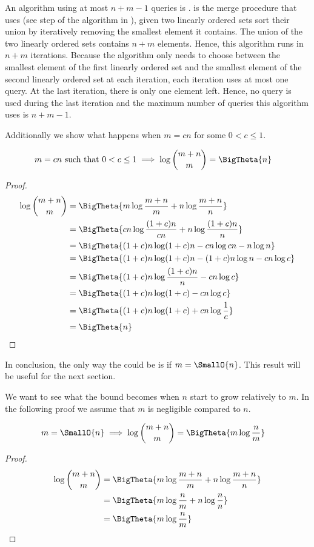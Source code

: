 An algorithm using at most \(n+m-1\) queries is \tapemerge. \tapemerge is the
merge procedure that \mergesort uses (see step  of the \mergesort
algorithm in ), \ie given two linearly ordered sets sort
their union by iteratively removing the smallest element it contains. The union
of the two linearly ordered sets contains \(n+m\) elements. Hence, this
algorithm runs in \(n+m\) iterations. Because the algorithm only needs to
choose between the smallest element of the first linearly ordered set and the
smallest element of the second linearly ordered set at each iteration, each
iteration uses at most one query. At the last iteration, there is only one
element left. Hence, no query is used during the last iteration and the maximum
number of queries this algorithm uses is \(n+m-1\).

Additionally we show what happens when \(m = c n\) for some \(0 < c \le 1\).
\begin{lemma}
\begin{align*}
m = c n \text{ such that } 0 < c \le 1 &\implies \log\binom{m+n}{m} = \BigTheta{n}
\end{align*}
\end{lemma}
\begin{proof}
\begin{align*}
\log\binom{m+n}{m} &= \BigTheta{m \log\frac{m+n}{m} + n \log\frac{m+n}{n}}\\
&= \BigTheta{cn \log\frac{(1+c)n}{cn} + n \log\frac{(1+c)n}{n}}\\
&= \BigTheta{(1+c)n \log (1+c)n - cn \log cn - n \log n}\\
&= \BigTheta{(1+c)n \log (1+c)n - (1+c)n \log n - cn \log c}\\
&= \BigTheta{(1+c)n \log \frac{(1+c)n}{n} - cn \log c}\\
&= \BigTheta{(1+c)n \log (1+c) - cn \log c}\\
&= \BigTheta{(1+c)n \log (1+c) + cn \log \frac{1}{c}}\\
&= \BigTheta{n}\qedhere
\end{align*}
\end{proof}

In conclusion, the only way the \ITLB could be  is if \(m =
\SmallO{n}\). This result will be useful for the next section.

We want to see what the bound becomes when $n$ start to grow relatively to
$m$. In the following proof we assume that $m$ is negligible compared to $n$.
\begin{lemma}
\begin{align*}
m = \SmallO{n} &\implies \log\binom{m+n}{m} = \BigTheta{m \log\frac{n}{m}}
\end{align*}
\end{lemma}
\begin{proof}
\begin{align*}
\log\binom{m+n}{m} &= \BigTheta{m \log\frac{m+n}{m} + n \log\frac{m+n}{n}}\\
&= \BigTheta{m \log\frac{n}{m} + n \log\frac{n}{n}}\\
&= \BigTheta{m \log\frac{n}{m}}\qedhere
\end{align*}
\end{proof}

